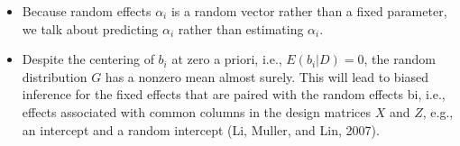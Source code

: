 \documentclass{article}
\begin{document}
\begin{itemize}
\item Because random effects $\alpha_i$ is a random vector rather than a fixed parameter, we talk about predicting $\alpha_i$ rather than estimating $\alpha_i$.

\item Despite the centering of $b_i$ at zero a priori, i.e., $E(b_i | D) = 0$, the random distribution $G$ has a nonzero mean almost surely. This will lead to biased inference for the fixed effects that are paired with the random effects bi, i.e., effects associated with common columns in the design matrices $X$ and $Z$, e.g., an intercept and a random intercept (Li, Muller, and Lin, 2007).
\end{itemize}









































\end{document}
